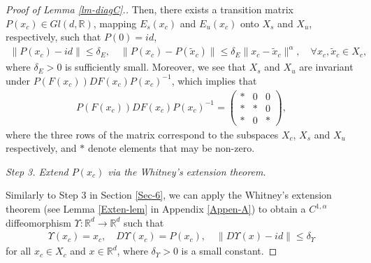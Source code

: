 \documentclass[reqno]{amsart}
\numberwithin{equation}{section}
\begin{document}
\begin{proof}[Proof of Lemma {\rm \ref{lm-diagC}}.]
Then, there exists a transition matrix $P(x_c) \in Gl(d, \mathbb R)$, mapping $E_s(x_c)$ and $E_u(x_c)$ onto $X_s$ and $X_u$, respectively, such that $P(0)=id$, 
\begin{align}\label{ps-holder}
\|P(x_c)-id\|   \le \delta_E, 
\quad \|P(x_c)-P(\tilde x_c)\| \le \delta_E \|x_c-\tilde{x}_c\|^\alpha,  \quad \forall x_c,\tilde x_c\in X_c,   
\end{align}
where $\delta_E>0$ is sufficiently small. 
Moreover, we see that $X_s$ and $X_u$ are invariant under $P(F(x_c))DF(x_c)P(x_c)^{-1}$, which implies that 
\begin{align}\label{diag-pcs}
P(F(x_c))DF(x_c)P(x_c)^{-1}=\left(
\begin{array}{ccc}
*& 0& 0
\\
*& *&0
\\
*& 0&*
\end{array}
\right), 
\end{align}
where the three rows of the matrix correspond to the subspaces $X_c$, $X_s$ and $X_u$ respectively, and $*$ denote elements that may be non-zero.

 
  


 


{\em  Step 3.   Extend $P(x_c)$ via the Whitney's extension theorem. }

Similarly to Step 3 in Section \ref{Sec-6}, we can apply the Whitney's extension theorem (see Lemma \ref{Exten-lem} in Appendix \ref{Appen-A}) to obtain a $C^{1,\alpha}$ diffeomorphism $\Upsilon:\mathbb R^d \to \mathbb{R}^d$ such that 
\begin{align}\label{D-upsi}
\Upsilon(x_c)=x_c, \quad D\Upsilon(x_{c})=P(x_c),\quad \|D\Upsilon(x)-id\|\le \delta_\Upsilon  
\end{align}
for all $x_c\in X_c$ and $x\in \mathbb{R}^d$, where $\delta_\Upsilon>0$ is a small constant.


\end{proof}
\end{document}
